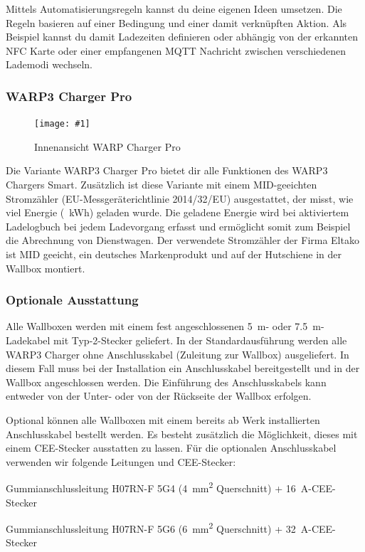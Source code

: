 \documentclass[a4paper,10pt]{article}
\newcommand{\gfx}[1]{\texttt{[image: \#1]}}
\begin{document}
\begin{multicols*}{2}
	Mittels Automatisierungsregeln kannst du deine eigenen Ideen umsetzen. 
	Die Regeln basieren auf einer Bedingung und einer damit verknüpften
	Aktion. Als Beispiel kannst du damit Ladezeiten definieren oder abhängig von 
	der erkannten NFC Karte oder einer empfangenen MQTT Nachricht 
	zwischen verschiedenen Lademodi wechseln.

	\subsubsection*{WARP3 Charger Pro}
    \begin{figure}[H]
        \gfx{./img_warp3/resized/warp3_pro_open}
        \caption*{Innenansicht WARP Charger Pro}
    \end{figure}

    Die Variante WARP3 Charger Pro bietet dir alle Funktionen des WARP3 Chargers Smart.
    Zusätzlich ist diese Variante mit einem MID-geeichten Stromzähler (EU-Messgeräterichtlinie 2014/32/EU)
    ausgestattet, der misst, wie viel Energie (\SI{}{\kWh}) geladen
    wurde. Die geladene Energie wird bei aktiviertem Ladelogbuch bei jedem
	Ladevorgang erfasst und ermöglicht somit zum Beispiel die Abrechnung von
	Dienstwagen. Der verwendete Stromzähler der Firma Eltako ist MID geeicht, ein deutsches
	Markenprodukt und auf der Hutschiene in der Wallbox montiert. 

	\subsubsection*{Optionale Ausstattung}
    Alle Wallboxen werden mit einem fest angeschlossenen
    \SI{5}{\meter}- oder \SI{7,5}{\meter}-Ladekabel mit Typ-2-Stecker geliefert.
    In der Standardausführung werden alle WARP3 Charger ohne Anschlusskabel
    (Zuleitung zur Wallbox) ausgeliefert. In diesem Fall muss bei der Installation
    ein Anschlusskabel bereitgestellt und in der Wallbox angeschlossen werden.
    Die Einführung des Anschlusskabels kann entweder von der Unter- oder von
    der Rückseite der Wallbox erfolgen.

    Optional können alle Wallboxen mit einem bereits ab Werk
    installierten Anschlusskabel bestellt werden. Es besteht zusätzlich die
    Möglichkeit, dieses mit einem CEE-Stecker ausstatten zu lassen.
    Für die optionalen Anschluss\-kabel verwenden wir folgende Leitungen und CEE-Stecker:

    \begin{description}[leftmargin=!,labelwidth=\widthof{\textbf{\SI{22}{\kilo\watt}}}]
        \item[\SI{11}{\kilo\watt}]Gummianschlussleitung H07RN-F 5G4
              (\SI{4}{\square\milli\meter}
              Querschnitt) + \SI{16}{\ampere}-CEE-Stecker
        \item[\SI{22}{\kilo\watt}]Gummianschlussleitung H07RN-F 5G6
              (\SI{6}{\square\milli\meter}
              Querschnitt) + \SI{32}{\ampere}-CEE-Stecker
    \end{description}


\end{multicols*}
\end{document}
